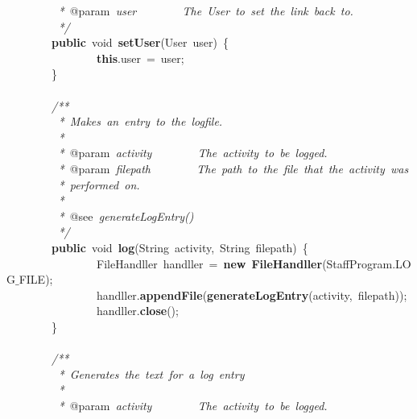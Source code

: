\mbox{}\textit{\ \ \ \ \ \ \ \ \ *\ }@param\textit{\ user\ \ \ \ \ \ \ \ The\ User\ to\ set\ the\ link\ back\ to.} \\
\mbox{}\textit{\ \ \ \ \ \ \ \ \ */} \\
\mbox{}\ \ \ \ \ \ \ \ \textbf{public}\ void\ \textbf{setUser}(User\ user)\ \{ \\
\mbox{}\ \ \ \ \ \ \ \ \ \ \ \ \ \ \ \ \textbf{this}.user\ =\ user; \\
\mbox{}\ \ \ \ \ \ \ \ \} \\
\mbox{}\ \ \ \ \ \ \ \  \\
\mbox{}\ \ \ \ \ \ \ \ \textit{/**} \\
\mbox{}\textit{\ \ \ \ \ \ \ \ \ *\ Makes\ an\ entry\ to\ the\ logfile.} \\
\mbox{}\textit{\ \ \ \ \ \ \ \ \ *\ } \\
\mbox{}\textit{\ \ \ \ \ \ \ \ \ *\ }@param\textit{\ activity\ \ \ \ \ \ \ \ The\ activity\ to\ be\ logged.} \\
\mbox{}\textit{\ \ \ \ \ \ \ \ \ *\ }@param\textit{\ filepath\ \ \ \ \ \ \ \ The\ path\ to\ the\ file\ that\ the\ activity\ was} \\
\mbox{}\textit{\ \ \ \ \ \ \ \ \ *\ performed\ on.} \\
\mbox{}\textit{\ \ \ \ \ \ \ \ \ *} \\
\mbox{}\textit{\ \ \ \ \ \ \ \ \ *\ }@see\textit{\ generateLogEntry()} \\
\mbox{}\textit{\ \ \ \ \ \ \ \ \ */} \\
\mbox{}\ \ \ \ \ \ \ \ \textbf{public}\ void\ \textbf{log}(String\ activity,\ String\ filepath)\ \{ \\
\mbox{}\ \ \ \ \ \ \ \ \ \ \ \ \ \ \ \ FileHandller\ handller\ =\ \textbf{new}\ \textbf{FileHandller}(StaffProgram.LOG$\_$FILE); \\
\mbox{}\ \ \ \ \ \ \ \ \ \ \ \ \ \ \ \ handller.\textbf{appendFile}(\textbf{generateLogEntry}(activity,\ filepath)); \\
\mbox{}\ \ \ \ \ \ \ \ \ \ \ \ \ \ \ \ handller.\textbf{close}(); \\
\mbox{}\ \ \ \ \ \ \ \ \} \\
\mbox{} \\
\mbox{}\ \ \ \ \ \ \ \ \textit{/**} \\
\mbox{}\textit{\ \ \ \ \ \ \ \ \ *\ Generates\ the\ text\ for\ a\ log\ entry} \\
\mbox{}\textit{\ \ \ \ \ \ \ \ \ *} \\
\mbox{}\textit{\ \ \ \ \ \ \ \ \ *\ }@param\textit{\ activity\ \ \ \ \ \ \ \ The\ activity\ to\ be\ logged.} \\
